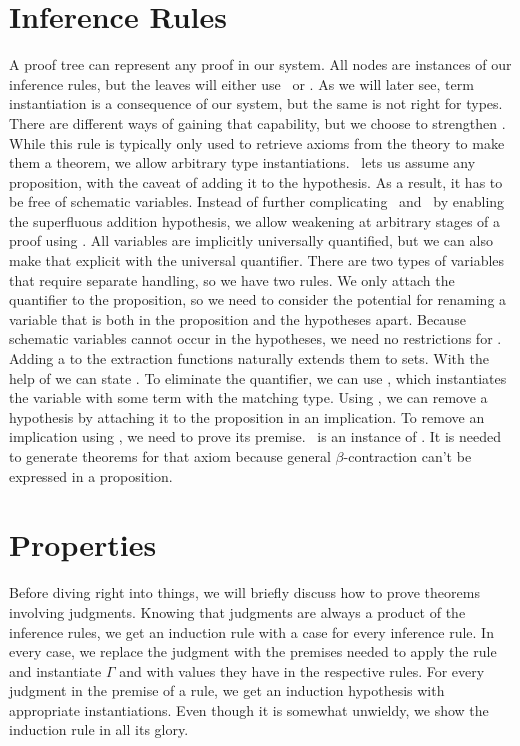 \section{Inference Rules}

A proof tree can represent any proof in our system.
All nodes are instances of our inference rules, but the leaves will either use \ax\ or \as.
As we will later see, term instantiation is a consequence of our system, but the same is not right for types.
There are different ways of gaining that capability, but we choose to strengthen \ax.
While this rule is typically only used to retrieve axioms from the theory to make them a theorem, we allow arbitrary type instantiations.
\as\ lets us assume any proposition, with the caveat of adding it to the hypothesis.
As a result, it has to be free of schematic variables.
Instead of further complicating \ax\ and \as\ by enabling the superfluous addition hypothesis, we allow weakening at arbitrary stages of a proof using \wk.
All variables are implicitly universally quantified, but we can also make that explicit with the universal quantifier.
There are two types of variables that require separate handling, so we have two rules.
We only attach the quantifier to the proposition, so we need to consider the potential for renaming a variable that is both in the proposition and the hypotheses apart.
Because schematic variables cannot occur in the hypotheses, we need no restrictions for \aIv.
Adding a  to the extraction functions naturally extends them to sets.
With the help of  we can state \aIf.
To eliminate the quantifier, we can use \aE, which instantiates the variable with some term with the matching type.
Using \iI, we can remove a hypothesis by attaching it to the proposition in an implication.
To remove an implication using \iE, we need to prove its premise.
\bcnv\ is an instance of \ax.
It is needed to generate theorems for that axiom because general \(\beta\)-contraction can't be expressed in a proposition.


\section{Properties}
Before diving right into things, we will briefly discuss how to prove theorems involving judgments.
Knowing that judgments are always a product of the inference rules, we get an induction rule with a case for every inference rule.
In every case, we replace the judgment with the premises needed to apply the rule and instantiate \(\Gamma\) and  with values they have in the respective rules.
For every judgment in the premise of a rule, we get an induction hypothesis with appropriate instantiations.
Even though it is somewhat unwieldy, we show the induction rule in all its glory.

